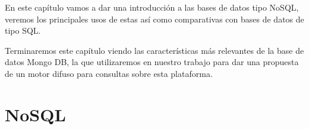 En este capítulo vamos a dar una introducción a las bases de datos tipo NoSQL, veremos los principales usos de estas así como comparativas con bases de datos de tipo SQL.

Terminaremos este capítulo viendo las características más relevantes de la base de datos Mongo DB, la que utilizaremos en nuestro trabajo para dar una propuesta de un motor difuso para consultas sobre esta plataforma.

\section{NoSQL}


